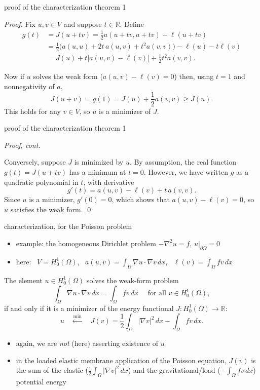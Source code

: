 \documentclass[10pt,
               svgnames,
               hyperref={colorlinks,
                         citecolor=DeepPink4,
                         linkcolor=FireBrick,
                         urlcolor=blue},
               usepdftitle=false]{beamer}
\newcommand{\RR}{\mathbb{R}}
\newcommand{\grad}{\nabla}
\begin{document}
\begin{frame}{proof of the characterization theorem 1}

\emph{Proof.}  Fix $u,v\in V$ and suppose $t\in \RR$.  Define
\begin{align*}
g(t) &= J(u+tv) = \frac{1}{2} a(u+tv,u+tv) - \ell(u+tv) \\
   &= \frac{1}{2} \Big(a(u,u) + 2 t\, a(u,v) + t^2 a(v,v)\Big) - \ell(u) - t \ell(v) \\
   &= J(u) + t\Big[a(u,v) - \ell(v)\Big] + \frac{1}{2} t^2 a(v,v).
\end{align*}

\medskip
Now if $u$ solves the weak form ($a(u,v) - \ell(v) =0$) then, using $t=1$ and nonnegativity of $a$,
	$$J(u+v) = g(1) = J(u) + \frac{1}{2} a(v,v) \ge J(u).$$
This holds for any $v\in V$, so $u$ is a minimizer of $J$.
\end{frame}


\begin{frame}{proof of the characterization theorem 1}

\emph{Proof, cont.}

\medskip
Conversely, suppose $J$ is minimized by $u$.  By assumption, the real function $g(t) = J(u+tv)$ has a minimum at $t=0$.  However, we have written $g$ as a quadratic polynomial in $t$, with derivative
	$$g'(t) = a(u,v) - \ell(v) + t\, a(v,v).$$
Since $u$ is a minimizer, $g'(0)=0$, which shows that $a(u,v)-\ell(v)=0$, so $u$ satisfies the weak form. \hfill \qed
\end{frame}


\begin{frame}{characterization, for the Poisson problem}

\begin{itemize}
\item example: the homogeneous Dirichlet problem $-\grad^2 u = f$, $u\big|_{\partial\Omega} = 0$
\item here: \, $V=H_0^1(\Omega)$, \, $a(u,v)=\int_\Omega \grad u \cdot \grad v\,dx$, \, $\ell(v)=\int_\Omega f v\,dx$
\end{itemize}

\begin{corollary}
The element $u\in H_0^1(\Omega)$ solves the weak-form problem
    $$\int_\Omega \grad u \cdot \grad v\,dx = \int_\Omega f v\,dx \quad \text{ for all } v\in H_0^1(\Omega),$$
if and only if it is a minimizer of the \alert{energy functional} $J:H_0^1(\Omega) \to \RR$:
	$$u \quad \stackrel{\min}{\leftarrow} \quad J(v) = \frac{1}{2} \int_\Omega |\grad v|^2\,dx - \int_\Omega f v\,dx.$$
\end{corollary}

\begin{itemize}
\item again, we are \emph{not} (here) asserting existence of $u$
\item in the loaded elastic membrane application of the Poisson equation, $J(v)$ is the sum of the elastic ($\frac{1}{2} \int_\Omega |\grad v|^2\,dx$) and the gravitational/load ($- \int_\Omega f v\,dx$) potential energy
\end{itemize}
\end{frame}
\end{document}
